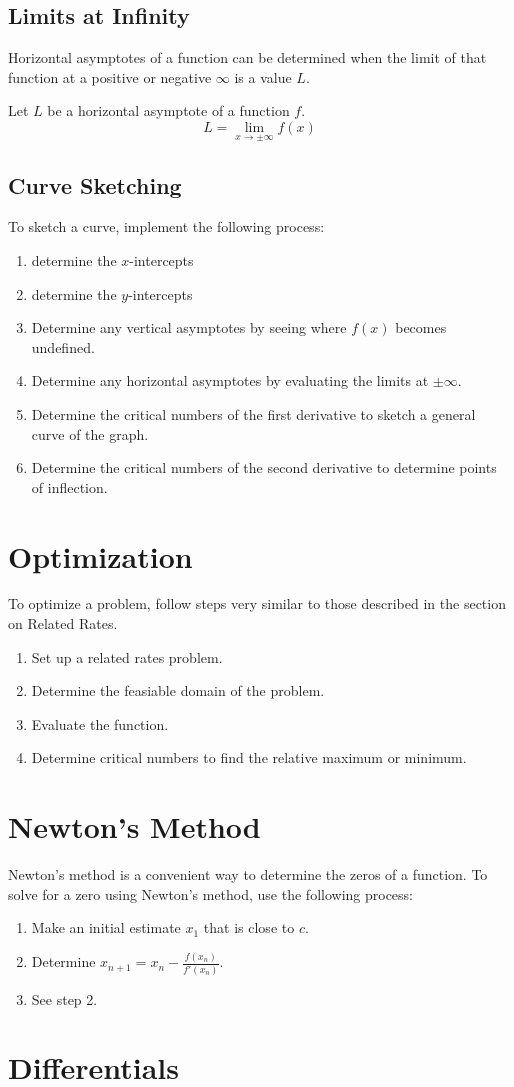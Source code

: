 \subsection{Limits at Infinity}
Horizontal asymptotes of a function can be determined when the limit of that
function at a positive or negative $\infty$ is a value $L$.

Let $L$ be a horizontal asymptote of a function $f$.
\begin{equation}
  L = \lim_{x\to\pm\infty} f(x)
\end{equation}

\subsection{Curve Sketching}
To sketch a curve, implement the following process:

\begin{enumerate}
  \item determine the $x$-intercepts
  \item determine the $y$-intercepts
  \item Determine any vertical asymptotes by seeing where $f(x)$ becomes
    undefined.
  \item Determine any horizontal asymptotes by evaluating the limits at
    $\pm\infty$.
  \item Determine the critical numbers of the first derivative to sketch a
    general curve of the graph.
  \item Determine the critical numbers of the second derivative to determine
    points of inflection.
\end{enumerate}

\section{Optimization}
To optimize a problem, follow steps very similar to those described in the
section on Related Rates.
\begin{enumerate}
  \item Set up a related rates problem.
  \item Determine the feasiable domain of the problem.
  \item Evaluate the function.
  \item Determine critical numbers to find the relative maximum or minimum.
\end{enumerate}

\section{Newton's Method}
Newton's method is a convenient way to determine the zeros of a function. To
solve for a zero using Newton's method, use the following process:
\begin{enumerate}
  \item Make an initial estimate $x_1$ that is close to $c$.
  \item Determine $x_{n+1}=x_n-\frac{f(x_n)}{f'(x_n)}$.
  \item See step 2.
\end{enumerate}

\section{Differentials}
